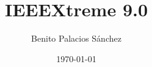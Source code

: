 \documentclass[usenames,dvipsnames]{beamer}
\title{IEEEXtreme 9.0}
\date[Septiembre de 2015]{\today}
\author{Benito Palacios Sánchez}
\institute[IEEE SB UGR]{IEEE Student Branch of Granada}
\begin{document}
\begin{frame}[plain]
    \titlepage
\end{frame}

\begin{frame}
	
\end{frame}
\end{document}
